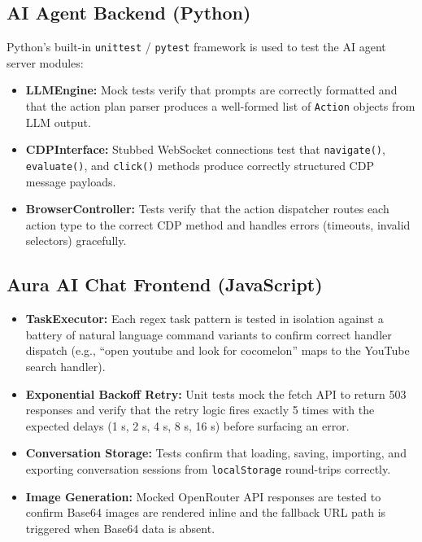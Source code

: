 \subsection{AI Agent Backend (Python)}
Python's built-in \texttt{unittest} / \texttt{pytest} framework is used to test the AI agent server modules:
\begin{itemize}[leftmargin=*]
    \item \textbf{LLMEngine:} Mock tests verify that prompts are correctly formatted and that the action plan parser produces a well-formed list of \texttt{Action} objects from LLM output.
    \item \textbf{CDPInterface:} Stubbed WebSocket connections test that \texttt{navigate()}, \texttt{evaluate()}, and \texttt{click()} methods produce correctly structured CDP message payloads.
    \item \textbf{BrowserController:} Tests verify that the action dispatcher routes each action type to the correct CDP method and handles errors (timeouts, invalid selectors) gracefully.
\end{itemize}

\subsection{Aura AI Chat Frontend (JavaScript)}
\begin{itemize}[leftmargin=*]
    \item \textbf{TaskExecutor:} Each regex task pattern is tested in isolation against a battery of natural language command variants to confirm correct handler dispatch (e.g., ``open youtube and look for cocomelon'' maps to the YouTube search handler).
    \item \textbf{Exponential Backoff Retry:} Unit tests mock the fetch API to return 503 responses and verify that the retry logic fires exactly 5 times with the expected delays (1 s, 2 s, 4 s, 8 s, 16 s) before surfacing an error.
    \item \textbf{Conversation Storage:} Tests confirm that loading, saving, importing, and exporting conversation sessions from \texttt{localStorage} round-trips correctly.
    \item \textbf{Image Generation:} Mocked OpenRouter API responses are tested to confirm Base64 images are rendered inline and the fallback URL path is triggered when Base64 data is absent.
\end{itemize}

